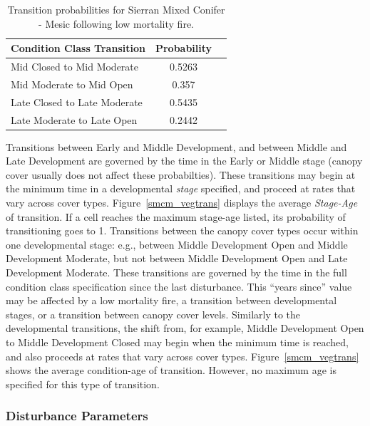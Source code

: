 \begin{table}[!htbp]
\small
\centering
\caption{Transition probabilities for Sierran Mixed Conifer - Mesic following low mortality fire.}
\label{smcm_firetrans}
\begin{tabular}{lcc}
\hline
\textbf{Condition Class Transition} & \textbf{Probability}\\
\hline
Mid Closed to Mid Moderate     	& 0.5263   	\\
Mid Moderate to Mid Open    	& 0.357		\\
Late Closed to Late Moderate	& 0.5435    \\
Late Moderate to Late Open     	& 0.2442    \\
\hline
\end{tabular}
\end{table}

Transitions between Early and Middle Development, and between Middle and Late Development are governed by the time in the Early or Middle stage (canopy cover usually does not affect these probabilties). These transitions may begin at the minimum time in a developmental \emph{stage} specified, and proceed at rates that vary across cover types. Figure~\ref{smcm_vegtrans} displays the average \emph{Stage-Age} of transition. If a cell reaches the maximum stage-age listed, its probability of transitioning goes to 1. Transitions between the canopy cover types occur within one developmental stage: e.g., between Middle Development Open and Middle Development Moderate, but not between Middle Development Open and Late Development Moderate. These transitions are governed by the time in the full condition class specification since the last disturbance. This ``years since'' value may be affected by a low mortality fire, a transition between developmental stages, or a transition between canopy cover levels. Similarly to the developmental transitions, the shift from, for example, Middle Development Open to Middle Development Closed may begin when the minimum time is reached, and also proceeds at rates that vary across cover types. Figure~\ref{smcm_vegtrans} shows the average condition-age of transition. However, no maximum age is specified for this type of transition.

\subsubsection{Disturbance Parameters} 

